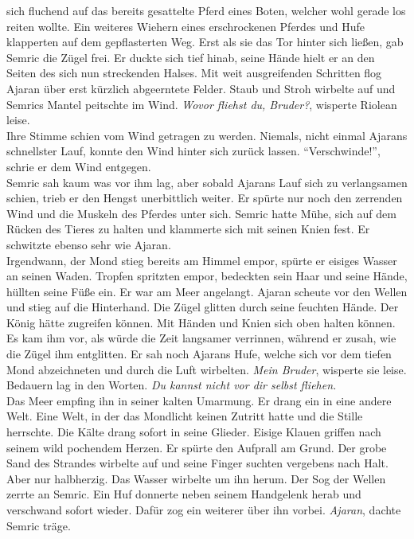 sich fluchend auf das bereits gesattelte Pferd eines Boten, welcher wohl gerade los reiten wollte. 
Ein weiteres Wiehern eines erschrockenen Pferdes und Hufe klapperten auf dem gepflasterten Weg. 
Erst als sie das Tor hinter sich ließen, gab Semric die Zügel frei. Er duckte sich tief hinab, 
seine Hände hielt er an den Seiten des sich nun streckenden Halses. Mit weit ausgreifenden 
Schritten flog Ajaran über erst kürzlich abgeerntete Felder. Staub und Stroh wirbelte auf und 
Semrics Mantel peitschte im Wind. \textit{Wovor fliehst du, Bruder?}, wisperte Riolean leise.\\
Ihre Stimme schien vom Wind getragen zu werden. Niemals, nicht einmal Ajarans schnellster Lauf, 
konnte den Wind hinter sich zurück lassen. ``Verschwinde!'', schrie er dem Wind entgegen. \\
Semric sah kaum was vor ihm lag, aber sobald Ajarans Lauf sich zu verlangsamen schien, trieb er den 
Hengst unerbittlich weiter. Er spürte nur noch den zerrenden Wind und die Muskeln des Pferdes unter 
sich. Semric hatte Mühe, sich auf dem Rücken des Tieres zu halten und klammerte sich mit seinen 
Knien fest. Er schwitzte ebenso sehr wie Ajaran. \\
Irgendwann, der Mond stieg bereits am Himmel empor, spürte er eisiges Wasser an seinen Waden. 
Tropfen spritzten empor, bedeckten sein Haar und seine Hände, hüllten seine Füße ein. Er war am 
Meer angelangt. Ajaran scheute vor den Wellen und stieg auf die Hinterhand. Die Zügel glitten durch 
seine feuchten Hände. Der König hätte zugreifen können. Mit Händen und Knien sich oben halten 
können. Es kam ihm vor, als würde die Zeit langsamer verrinnen, während er zusah, wie die Zügel ihm 
entglitten. Er sah noch Ajarans Hufe, welche sich vor dem tiefen Mond abzeichneten und durch die 
Luft wirbelten. \textit{Mein Bruder}, wisperte sie leise. Bedauern lag in den Worten. \textit{Du 
kannst nicht vor dir selbst fliehen.}\\
Das Meer empfing ihn in seiner kalten Umarmung. Er drang ein in eine andere Welt. Eine Welt, in der 
das Mondlicht keinen Zutritt hatte und die Stille herrschte. Die Kälte drang sofort in seine 
Glieder. Eisige Klauen griffen nach seinem wild pochendem Herzen. Er spürte den Aufprall am Grund. 
Der grobe Sand des Strandes wirbelte auf und seine Finger suchten vergebens nach Halt. Aber nur 
halbherzig. Das Wasser wirbelte um ihn herum. Der Sog der Wellen zerrte an Semric. Ein Huf donnerte 
neben seinem Handgelenk herab und verschwand sofort wieder. Dafür zog ein weiterer über ihn vorbei. 
\textit{Ajaran}, dachte Semric träge. \\
